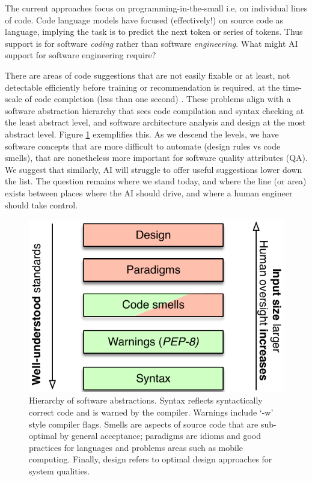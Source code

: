 \label{chapter:Exp}

The current approaches focus on programming-in-the-small i.e, on individual lines of code. 
Code language models have focused (effectively!) on source code as language, implying the task is to predict the next token or series of tokens.
Thus support is for software \textit{coding} rather than software \emph{engineering}. 
What might AI support for software engineering require? 

There are areas of code suggestions that are not easily fixable or at least, not detectable efficiently before training or recommendation is required, at the time-scale of code completion (less than one second) \cite{}.
These problems align with a software abstraction hierarchy that sees code compilation and syntax checking at the least abstract level, and software architecture analysis and design at the most abstract level.
Figure \ref{fig:levels} exemplifies this. 
As we descend the levels, we have software concepts that are more difficult to automate (design rules vs code smells), that are nonetheless more important for software quality attributes (QA). 
We suggest that similarly, AI will struggle to offer useful suggestions lower down the list. 
The question remains where we stand today, and where the line (or area) exists between places where the AI should drive, and where a human engineer should take control.

\begin{figure}
    \centering
    \includegraphics[width=.5\linewidth]{Figures/taxonomy-copilot.pdf}
    \caption{Hierarchy of software abstractions. Syntax reflects syntactically correct code and is warned by the compiler. Warnings include `-w' style compiler flags. Smells are aspects of source code that are sub-optimal by general acceptance; paradigms are idioms and good practices for languages and problems areas such as mobile computing. Finally, design refers to optimal design approaches for system qualities.}
    \label{fig:levels}
\end{figure}

